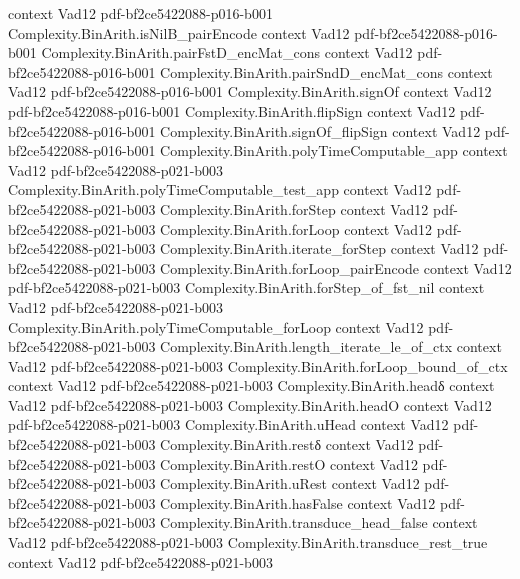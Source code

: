 \begin{theorem}
  {context}
  {Vad12}
  {pdf-bf2ce5422088-p016-b001}
\proofstep
  {Complexity.BinArith.isNilB_pairEncode}
  {context}
  {Vad12}
  {pdf-bf2ce5422088-p016-b001}
\proofstep
  {Complexity.BinArith.pairFstD_encMat_cons}
  {context}
  {Vad12}
  {pdf-bf2ce5422088-p016-b001}
\proofstep
  {Complexity.BinArith.pairSndD_encMat_cons}
  {context}
  {Vad12}
  {pdf-bf2ce5422088-p016-b001}
\proofstep
  {Complexity.BinArith.signOf}
  {context}
  {Vad12}
  {pdf-bf2ce5422088-p016-b001}
\proofstep
  {Complexity.BinArith.flipSign}
  {context}
  {Vad12}
  {pdf-bf2ce5422088-p016-b001}
\proofstep
  {Complexity.BinArith.signOf_flipSign}
  {context}
  {Vad12}
  {pdf-bf2ce5422088-p016-b001}
\proofstep
  {Complexity.BinArith.polyTimeComputable_app}
  {context}
  {Vad12}
  {pdf-bf2ce5422088-p021-b003}
\proofstep
  {Complexity.BinArith.polyTimeComputable_test_app}
  {context}
  {Vad12}
  {pdf-bf2ce5422088-p021-b003}
\proofstep
  {Complexity.BinArith.forStep}
  {context}
  {Vad12}
  {pdf-bf2ce5422088-p021-b003}
\proofstep
  {Complexity.BinArith.forLoop}
  {context}
  {Vad12}
  {pdf-bf2ce5422088-p021-b003}
\proofstep
  {Complexity.BinArith.iterate_forStep}
  {context}
  {Vad12}
  {pdf-bf2ce5422088-p021-b003}
\proofstep
  {Complexity.BinArith.forLoop_pairEncode}
  {context}
  {Vad12}
  {pdf-bf2ce5422088-p021-b003}
\proofstep
  {Complexity.BinArith.forStep_of_fst_nil}
  {context}
  {Vad12}
  {pdf-bf2ce5422088-p021-b003}
\proofstep
  {Complexity.BinArith.polyTimeComputable_forLoop}
  {context}
  {Vad12}
  {pdf-bf2ce5422088-p021-b003}
\proofstep
  {Complexity.BinArith.length_iterate_le_of_ctx}
  {context}
  {Vad12}
  {pdf-bf2ce5422088-p021-b003}
\proofstep
  {Complexity.BinArith.forLoop_bound_of_ctx}
  {context}
  {Vad12}
  {pdf-bf2ce5422088-p021-b003}
\proofstep
  {Complexity.BinArith.headδ}
  {context}
  {Vad12}
  {pdf-bf2ce5422088-p021-b003}
\proofstep
  {Complexity.BinArith.headO}
  {context}
  {Vad12}
  {pdf-bf2ce5422088-p021-b003}
\proofstep
  {Complexity.BinArith.uHead}
  {context}
  {Vad12}
  {pdf-bf2ce5422088-p021-b003}
\proofstep
  {Complexity.BinArith.restδ}
  {context}
  {Vad12}
  {pdf-bf2ce5422088-p021-b003}
\proofstep
  {Complexity.BinArith.restO}
  {context}
  {Vad12}
  {pdf-bf2ce5422088-p021-b003}
\proofstep
  {Complexity.BinArith.uRest}
  {context}
  {Vad12}
  {pdf-bf2ce5422088-p021-b003}
\proofstep
  {Complexity.BinArith.hasFalse}
  {context}
  {Vad12}
  {pdf-bf2ce5422088-p021-b003}
\proofstep
  {Complexity.BinArith.transduce_head_false}
  {context}
  {Vad12}
  {pdf-bf2ce5422088-p021-b003}
\proofstep
  {Complexity.BinArith.transduce_rest_true}
  {context}
  {Vad12}
  {pdf-bf2ce5422088-p021-b003}

\end{theorem}
